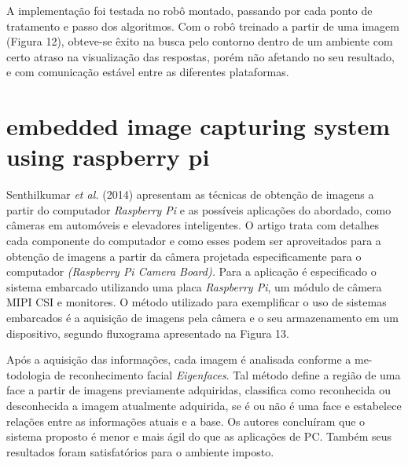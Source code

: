 \documentclass[12pt,oneside,a4paper,chapter=TITLE,section=TITLE,sumario=tradicional]{abntex2}
\begin{document}
\begin{figure}[htb]
\end{figure}

A implementação foi testada no robô montado, passando por cada ponto de tratamento e passo dos algoritmos. Com o robô treinado a partir de uma imagem (Figura 12), obteve-se êxito na busca pelo contorno dentro de um ambiente com certo atraso na visualização das respostas, porém não afetando no seu resultado, e com comunicação estável entre as diferentes plataformas.

\begin{figure}[htb]
\end{figure}


\section{embedded image capturing system using raspberry pi}
Senthilkumar \textit{et al.} (2014) apresentam as técnicas de obtenção de imagens a partir do computador \textit{Raspberry Pi} e as possíveis aplicações do abordado, como câmeras em automóveis e elevadores inteligentes. O artigo trata com detalhes cada componente do computador e como esses podem ser aproveitados para a obtenção de imagens a partir da câmera projetada especificamente para o computador \textit{(Raspberry Pi Camera Board).}
Para a aplicação é especificado o sistema embarcado utilizando uma placa \textit{Raspberry Pi}, um módulo de câmera MIPI CSI e monitores. O método utilizado para exemplificar o uso de sistemas embarcados é a aquisição de imagens pela câmera e o seu armazenamento em um dispositivo, segundo fluxograma apresentado na Figura 13.

\begin{figure}[htb]
\end{figure}

Após a aquisição das informações, cada imagem é analisada conforme a me-todologia de reconhecimento facial \textit{Eigenfaces}. Tal método define a região de uma face a partir de imagens previamente adquiridas, classifica como reconhecida ou desconhecida a imagem atualmente adquirida, se é ou não é uma face e estabelece relações entre as informações atuais e a base.
Os autores concluíram que o sistema proposto é menor e mais ágil do que as aplicações de PC. Também seus resultados foram satisfatórios para o ambiente imposto.
\end{document}
